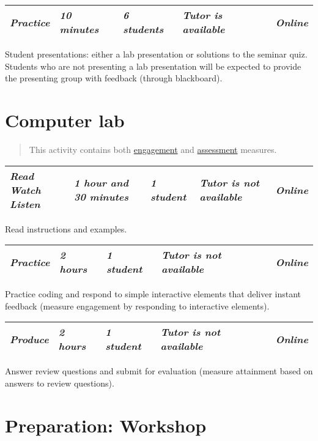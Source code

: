 \documentclass[
]{book}
\begin{document}
\begin{longtable}[]{@{}lllll@{}}
\toprule
\endhead
\emph{Practice} & \emph{10 minutes} & \emph{6 students} & \emph{Tutor is available} & \emph{Online}\tabularnewline
\bottomrule
\end{longtable}

Student presentations: either a lab presentation or solutions to the seminar quiz. Students who are not presenting a lab presentation will be expected to provide the presenting group with feedback (through blackboard).

\hypertarget{computer-lab}{%
\section{Computer lab}\label{computer-lab}}

\begin{quote}
This activity contains both \protect\hyperlink{engagement}{engagement} and \protect\hyperlink{assessment}{assessment} measures.
\end{quote}

\begin{longtable}[]{@{}lllll@{}}
\toprule
\endhead
\emph{Read Watch Listen} & \emph{1 hour and 30 minutes} & \emph{1 student} & \emph{Tutor is not available} & \emph{Online}\tabularnewline
\bottomrule
\end{longtable}

Read instructions and examples.

\begin{longtable}[]{@{}lllll@{}}
\toprule
\endhead
\emph{Practice} & \emph{2 hours} & \emph{1 student} & \emph{Tutor is not available} & \emph{Online}\tabularnewline
\bottomrule
\end{longtable}

Practice coding and respond to simple interactive elements that deliver
instant feedback (measure engagement by responding to interactive
elements).

\begin{longtable}[]{@{}lllll@{}}
\toprule
\endhead
\emph{Produce} & \emph{2 hours} & \emph{1 student} & \emph{Tutor is not available} & \emph{Online}\tabularnewline
\bottomrule
\end{longtable}

Answer review questions and submit for evaluation (measure attainment
based on answers to review questions).

\hypertarget{preparation-workshop}{%
\section{Preparation: Workshop}\label{preparation-workshop}}
\end{document}
